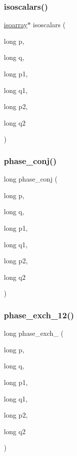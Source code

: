 \mbox{\label{adat-devel_2lib_2SU3_2SU3_8h_af6d3c492b2cce16ac0e23e3a625b1039}} 
\subsubsection{\texorpdfstring{isoscalars()}{isoscalars()}}
{\footnotesize\ttfamily \mbox{\hyperlink{classisoarray}{isoarray}}$\ast$ isoscalars (\begin{DoxyParamCaption}\item[{long}]{p,  }\item[{long}]{q,  }\item[{long}]{p1,  }\item[{long}]{q1,  }\item[{long}]{p2,  }\item[{long}]{q2 }\end{DoxyParamCaption})}

\mbox{\label{adat-devel_2lib_2SU3_2SU3_8h_a0b98dde903eb63eb5e4ad4aefa492787}} 
\subsubsection{\texorpdfstring{phase\_conj()}{phase\_conj()}}
{\footnotesize\ttfamily long phase\+\_\+conj (\begin{DoxyParamCaption}\item[{long}]{p,  }\item[{long}]{q,  }\item[{long}]{p1,  }\item[{long}]{q1,  }\item[{long}]{p2,  }\item[{long}]{q2 }\end{DoxyParamCaption})}

\mbox{\label{adat-devel_2lib_2SU3_2SU3_8h_aa2fc81838328560e24ea8a4c4d4c02be}} 
\subsubsection{\texorpdfstring{phase\_exch\_12()}{phase\_exch\_12()}}
{\footnotesize\ttfamily long phase\+\_\+exch\+\_ (\begin{DoxyParamCaption}\item[{long}]{p,  }\item[{long}]{q,  }\item[{long}]{p1,  }\item[{long}]{q1,  }\item[{long}]{p2,  }\item[{long}]{q2 }\end{DoxyParamCaption})}


